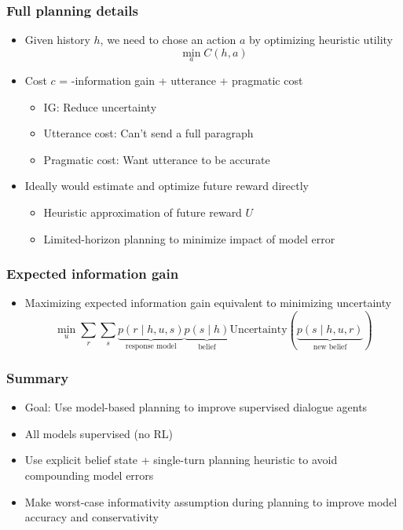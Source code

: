 \documentclass{beamer}
\begin{document}
\begin{frame}
\frametitle{Full planning details}
\begin{itemize}
\item Given history $h$,
we need to chose an action $a$ by optimizing heuristic utility
\begin{equation*}
\min_a C(h, a)
\end{equation*}
\item Cost $c$ = -information gain + utterance + pragmatic cost
    \begin{itemize}
    \item IG: Reduce uncertainty
    \item Utterance cost: Can't send a full paragraph
    \item Pragmatic cost: Want utterance to be accurate
    \end{itemize}
\item Ideally would estimate and optimize future reward directly
    \begin{itemize}
    \item Heuristic approximation of future reward $U$
    \item Limited-horizon planning to minimize impact of model error
    \end{itemize}
\end{itemize}
\end{frame}

\begin{frame}
\frametitle{Expected information gain}
\begin{itemize}
\item Maximizing expected information gain equivalent to minimizing uncertainty
$$\min_u \sum_r\sum_s
    \underbrace{p(r\mid h,u,s)}_{\text{response model}}
    \underbrace{p(s\mid h)}_{\text{belief}}
    \text{Uncertainty}(\underbrace{p(s \mid h,u,r)}_{\text{new belief}})$$
\end{itemize}
\end{frame}

\begin{frame}
\frametitle{Summary}
\begin{itemize}
\item Goal: Use model-based planning to improve supervised dialogue agents
\item All models supervised (no RL)
\item Use explicit belief state + single-turn planning heuristic to avoid
    compounding model errors
\item Make worst-case informativity assumption during planning
    to improve model accuracy and conservativity
\end{itemize}
\end{frame}
\end{document}
